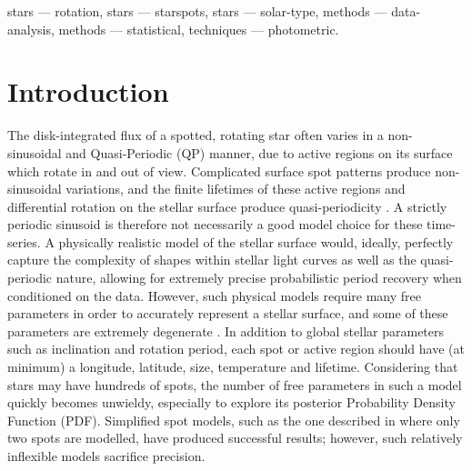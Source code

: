 \documentclass[a4paper,fleqn,usenatbib,useAMS]{mnras}
\newcommand{\eg}{{\it e.g.}}
\begin{document}
\begin{keywords}
    stars --- rotation,
    stars --- starspots,
    stars --- solar-type,
    methods --- data-analysis,
    methods --- statistical,
    techniques --- photometric.
\end{keywords}


\section{Introduction}
\label{sec:intro}

The disk-integrated flux of a spotted, rotating star often varies in a
non-sinusoidal and Quasi-Periodic (QP) manner, due to active regions on its
surface which rotate in and out of view.
Complicated surface spot patterns produce non-sinusoidal variations, and the
finite lifetimes of these active regions and differential rotation on the
stellar surface produce quasi-periodicity \citep{Dumusque2011}.
A strictly periodic sinusoid is therefore not necessarily a good model choice
for these time-series.
A physically realistic model of the stellar surface
would, ideally,  perfectly capture the complexity of shapes
within stellar light curves as well as the quasi-periodic nature, allowing for
extremely precise probabilistic period recovery when conditioned on the data.
However, such physical models require many free parameters in order to
accurately represent a stellar surface, and some of these parameters are
extremely degenerate \citep[\eg][]{Russell1906, Jeffers2009, Kipping2012}.
In addition to global stellar parameters such as inclination and rotation
period, each spot or active region should have (at minimum) a longitude,
latitude, size, temperature and lifetime.
Considering that stars may have hundreds of spots, the number of free
parameters in such a model quickly becomes unwieldy, especially to explore its
posterior Probability Density Function (PDF).
Simplified spot models, such as the one described in \citet{Lanza2014} where
only two spots are modelled, have produced successful results; however, such
relatively inflexible models sacrifice precision.
\end{document}
